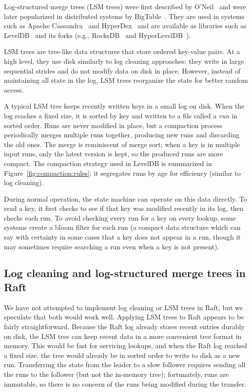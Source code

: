 Log-structured merge trees (LSM trees) were first described by
O'Neil~\cite{ONeil:1996} and were later popularized in distributed
systems by BigTable~\cite{Chang:2006}. They are used in systems such as
Apache Cassandra~\cite{Cassandra} and HyperDex~\cite{Escriva:2012} and
are available as libraries such as LevelDB~\cite{leveldb} and its forks
(e.g., RocksDB~\cite{rocksdb} and HyperLevelDB~\cite{hyperleveldb}).

LSM trees are tree-like data structures that store ordered key-value
pairs. At a high level, they use disk similarly to log cleaning
approaches: they write in large sequential strides and do not modify
data on disk in place. However, instead of maintaining all state in the
log, LSM trees reorganize the state for better random access.

A typical LSM tree keeps recently written keys in a small log on disk.
When the log reaches a fixed size, it is sorted by key and written to
a file called a \emph{run} in sorted order.
Runs are never modified in place, but a compaction process periodically
merges multiple runs together, producing new runs and discarding the old
ones. The merge is reminiscent of merge sort; when a key is in multiple
input runs, only the latest version is kept, so the produced runs are
more compact. The compaction strategy used in LevelDB is summarized in
Figure~\ref{fig:compaction:rules}; it segregates runs by age for
efficiency (similar to log cleaning).

During normal operation, the state machine can operate on this data
directly. To read a key, it first checks to see if that key was modified
recently in its log, then checks each run. To avoid checking every run
for a key on every lookup, some systems create a bloom filter for each
run (a compact data structure which can say with certainty in some cases
that a key does not appear in a run, though it may sometimes require
searching a run even when a key is not present).

\subsection{Log cleaning and log-structured merge trees in Raft}
\label{compaction:incremental:raft}

We have not attempted to implement log cleaning or LSM trees in Raft,
but we speculate that both would work well. Applying LSM trees to Raft
appears to be fairly straightforward. Because the Raft log already
stores recent entries durably on disk, the LSM tree can keep recent data
in a more convenient tree format in memory. This would be fast for servicing
lookups, and when the Raft log reached a fixed size, the tree would already
be in sorted order to write to disk as a new run. Transferring the state
from the leader to a slow follower requires sending all the runs to the
follower (but not the in-memory tree); fortunately, runs are immutable,
so there is no concern of the runs being modified during the transfer.

